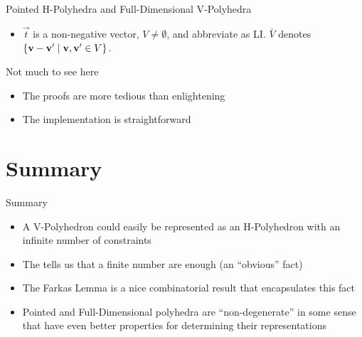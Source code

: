\documentclass{beamer}
\begin{document}
\begin{frame}{Pointed H-Polyhedra and Full-Dimensional V-Polyhedra}
\begin{itemize}
  \item $\vec{t}$ is a non-negative vector, $V \neq \emptyset$, and abbreviate {\LI} as LI. $\bar V$ denotes $\{\mathbf{v}-\mathbf{v}'\;|\;\mathbf{v},\mathbf{v}'\in V\}$.\\

  \renewcommand{\arraystretch}{1.3}
\end{itemize}
\end{frame}

\begin{frame}{Not much to see here}
\begin{itemize}
  \item The proofs are more tedious than enlightening
  \item The implementation is straightforward
\end{itemize}
\end{frame}


\section*{Summary}

\begin{frame}{Summary}

	\begin{itemize}
		\item<1-> A V-Polyhedron could easily be represented as an H-Polyhedron with an infinite number of constraints
		\item<2-> The {\MWT} tells us that a finite number are enough (an ``obvious'' fact)
		\item<3-> The Farkas Lemma is a nice combinatorial result that encapsulates this fact
    \item<4-> Pointed and Full-Dimensional polyhedra are ``non-degenerate'' in some sense that have even better properties for determining their representations
	\end{itemize}
\end{frame}
\end{document}

